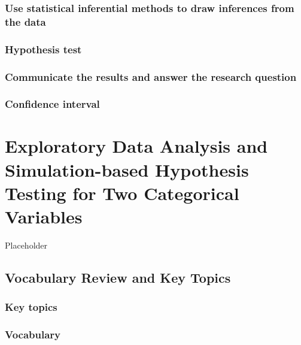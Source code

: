 \documentclass[
]{report}
\begin{document}
\subsection*{Use statistical inferential methods to draw inferences from the data}\label{use-statistical-inferential-methods-to-draw-inferences-from-the-data-1}

\subsection*{Hypothesis test}\label{hypothesis-test}

\subsection*{Communicate the results and answer the research question}\label{communicate-the-results-and-answer-the-research-question-2}

\subsection*{Confidence interval}\label{confidence-interval-1}

\chapter{Exploratory Data Analysis and Simulation-based Hypothesis Testing for Two Categorical Variables}\label{exploratory-data-analysis-and-simulation-based-hypothesis-testing-for-two-categorical-variables}

Placeholder

\section{Vocabulary Review and Key Topics}\label{vocabulary-review-and-key-topics-6}

\subsection{Key topics}\label{key-topics-7}

\subsection{Vocabulary}\label{vocabulary-6}
\end{document}
